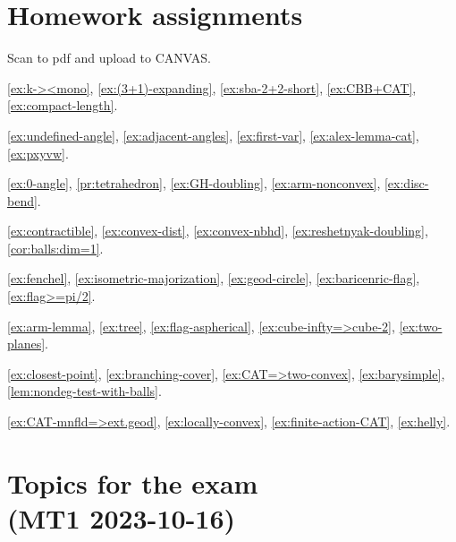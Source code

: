 \chapter*{Homework assignments}

Scan to pdf and upload to CANVAS.

\ref{ex:k-><mono},
\ref{ex:(3+1)-expanding},
\ref{ex:sba-2+2-short},
\ref{ex:CBB+CAT},
\ref{ex:compact-length}.

\ref{ex:undefined-angle},
\ref{ex:adjacent-angles},
\ref{ex:first-var},
\ref{ex:alex-lemma-cat},
\ref{ex:pxyvw}.

\ref{ex:0-angle},
\ref{pr:tetrahedron},
\ref{ex:GH-doubling},
\ref{ex:arm-nonconvex},
\ref{ex:disc-bend}.

\ref{ex:contractible},
\ref{ex:convex-dist},
\ref{ex:convex-nbhd},
\ref{ex:reshetnyak-doubling},
\ref{cor:balls:dim=1}.

\ref{ex:fenchel},
\ref{ex:isometric-majorization},
\ref{ex:geod-circle},
\ref{ex:baricenric-flag},
\ref{ex:flag>=pi/2}.

\ref{ex:arm-lemma},
\ref{ex:tree},
\ref{ex:flag-aspherical},
\ref{ex:cube-infty=>cube-2},
\ref{ex:two-planes}.

\ref{ex:closest-point},
\ref{ex:branching-cover},
\ref{ex:CAT=>two-convex},
\ref{ex:barysimple},
\ref{lem:nondeg-test-with-balls}.

\ref{ex:CAT-mnfld=>ext.geod},
\ref{ex:locally-convex},
\ref{ex:finite-action-CAT},
\ref{ex:helly}.


\newpage

\chapter*{Topics for the exam\\ (MT1 2023-10-16)}

